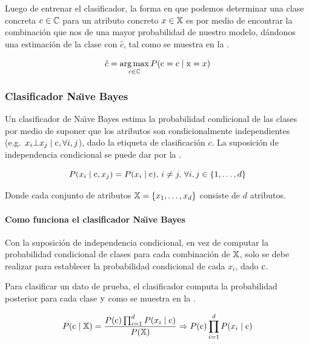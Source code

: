 Luego de entrenar el clasificador, la forma en que podemos determinar una clase concreta $c \in {\mathbb{C}}$ para un atributo concreto $x \in {\mathbb{X}}$ es por medio de encontrar la combinación que nos de una mayor probabilidad de nuestro modelo, dándonos una estimación de la clase con $\hat{c}$, tal como se muestra en la .

\begin{equation} \label{eq:bayes-clasification-argmax}
  \hat{c} = \operatorname*{arg\,max}_{c\in{\mathbb{C}}} P({\textnormal{c}} = c \mid {\textnormal{x}} = x)
\end{equation}

\subsubsection{Clasificador Na\"{\i}ve Bayes} \label{subsec:naivebayes}
Un clasificador de Na\"{\i}ve Bayes estima la probabilidad condicional de las clases por medio de suponer que los atributos son condicionalmente independientes \mbox{(e.g. $x_i \bot x_j \mid {\textnormal{c}}, \forall i, j$)}, dado la etiqueta de clasificación $c$. La suposición de independencia condicional se puede dar por la .

\begin{equation} \label{eq:bayes-conditional-independence}
  P(x_i \mid {\textnormal{c}}, x_j) = P(x_i \mid {\textnormal{c}}), \, i \neq j, \, \forall i, j \in \{1, \ldots, d\}
\end{equation}

Donde cada conjunto de atributos ${\mathbb{X}}=\{ x_1, \ldots, x_d \}$ consiste de $d$ atributos.
\paragraph{Como funciona el clasificador Na\"{\i}ve Bayes}
Con la suposición de independencia condicional, en vez de computar la probabilidad condicional de clases para cada combinación de ${\mathbb{X}}$, solo se debe realizar para establecer la probabilidad condicional de cada $x_i$, dado ${\textnormal{c}}$.

Para clasificar un dato de prueba, el clasificador computa la probabilidad posterior para cada clase ${\textnormal{y}}$ como se muestra en la .

\begin{equation} \label{eq:bayes-classifier}
  P({\textnormal{c}}\mid {\mathbb{X}}) = \frac{P({\textnormal{c}}) \prod_{i=1}^{d}P(x_i\mid{\textnormal{c}})}{P({\mathbb{X}})} \Rightarrow P({\textnormal{c}}) \prod_{i=1}^{d}P(x_i\mid{\textnormal{c}})
\end{equation}

